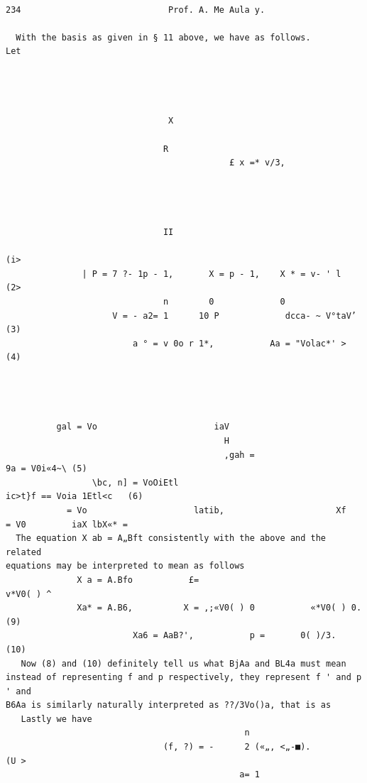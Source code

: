 \documentclass[10pt]{article}
\begin{document}
\clearpage
\begin{verbatim}

234                             Prof. A. Me Aula y.

  With the basis as given in § 11 above, we have as follows.                 Let




                                X

                               R
                                            £ x =* v/3,




                               II
                                                                                           (i>
               | P = 7 ?- 1p - 1,       X = p - 1,    X * = v- ' l                         (2>
                               n        0             0
                     V = - a2= 1      10 P             dcca- ~ V°taV’                      (3)
                         a ° = v 0o r 1*,           Aa = "Volac*' >                    (4)




          gal = Vo                       iaV
                                           H
                                           ,gah =                         9a = V0i«4~\ (5)
                 \bc, n] = VoOiEtl                                       ic>t}f == Voia 1Etl<c   (6)
            = Vo                     latib,                      Xf          = V0         iaX lbX«* =
  The equation X ab = A„Bft consistently with the above and the related
equations may be interpreted to mean as follows
              X a = A.Bfo           £=                                                   v*V0( ) ^
              Xa* = A.B6,          X = ,;«V0( ) 0           «*V0( ) 0.                     (9)
                         Xa6 = AaB?',           p =       0( )/3.                         (10)
   Now (8) and (10) definitely tell us what BjAa and BL4a must mean
instead of representing f and p respectively, they represent f ' and p ' and
B6Aa is similarly naturally interpreted as ??/3Vo()a, that is as
   Lastly we have
                                               n
                               (f, ?) = -      2 («„, <„-■).                              (U >
                                              a= 1


\end{verbatim}
\end{document}
